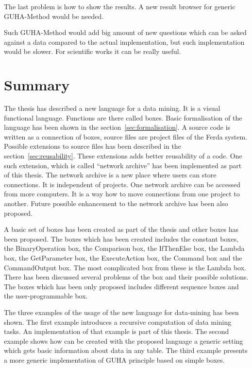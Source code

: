 \documentclass[a4paper,12pt]{book}
\begin{document}
The last problem is how to show the results. A new result browser for generic GUHA-Method would be needed.

Such GUHA-Method would add big amount of new questions which can be asked against a data compared to the actual implementation, but such implementation would be slower. For scientific works it can be really useful.

\chapter{Summary}
The thesis has described a new language for a data mining. It is a visual functional language. Functions are there called boxes. Basic formalisation of the language has been shown in the section~\ref{sec:formalisation}. A source code is written as a connection of boxes, source files are project files of the Ferda system. Possible extensions to source files has been described in the section~\ref{sec:reusability}. These extensions adds better reusability of a code. One such extension, which is called ``network archive'' has been implemented as part of this thesis. The network archive is a new place where users can store connections. It is independent of projects. One network archive can be accessed from more computers. It is a way how to move connections from one project to another. Future possible enhancement to the network archive has been also proposed.

A basic set of boxes has been created as part of the thesis and other boxes has been proposed. The boxes which has been created includes the constant boxes, the BinaryOperation box, the Comparison box, the IfThenElse box, the Lambda box, the GetParameter box, the ExecuteAction box, the Command box and the CommandOutput box. The most complicated box from these is the Lambda box. There has been discussed several problems of the box and their possible solutions. The boxes which has been only proposed includes different sequence boxes and the user-programmable box.

The three examples of the usage of the new language for data-mining has been shown. The first example introduces a recursive computation of data mining tasks. An implementation of that example is part of this thesis. The second example shows how can be created with the proposed language a generic setting which gets basic information about data in any table. The third example presents a more generic implementation of GUHA principle based on simple boxes.

\end{document}
